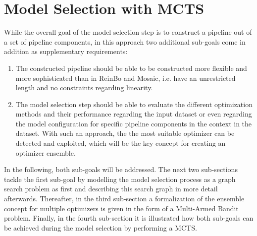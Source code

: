\section{Model Selection with MCTS}
\label{sec:approach:selection}
While the overall goal of the model selection step is to construct a pipeline out of a set of pipeline components, in this approach two additional sub-goals come in addition as supplementary requirements:
\begin{enumerate}
    \item The constructed pipeline should be able to be constructed more flexible and more sophisticated than in ReinBo and Mosaic, i.e. have an unrestricted length and no constraints regarding linearity.
    \item The model selection step should be able to evaluate the different optimization methods and their performance regarding the input dataset or even regarding the model configuration for specific pipeline components in the context in the dataset.
    With such an approach, the the most suitable optimizer can be detected and exploited, which will be the key concept for creating an optimizer ensemble.
\end{enumerate}
In the following, both sub-goals will be addressed.
The next two sub-sections tackle the first sub-goal by modelling the model selection process as a graph search problem as first and describing this search graph in more detail afterwards.
Thereafter, in the third sub-section a formalization of the ensemble concept for multiple optimizers is given in the form of a Multi-Armed Bandit problem.
Finally, in the fourth sub-section it is illustrated how both sub-goals can be achieved during the model selection by performing a MCTS.

